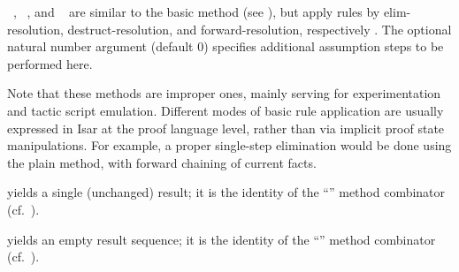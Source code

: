 \begin{isabellebody}
\begin{isamarkuptext}
\begin{description}
  \item \hyperlink{method.erule}{\mbox{}}~, \hyperlink{method.drule}{\mbox{}}~, and \hyperlink{method.frule}{\mbox{}}~ are similar to the basic \hyperlink{method.rule}{\mbox{}}
  method (see ), but apply rules by
  elim-resolution, destruct-resolution, and forward-resolution,
  respectively \cite{isabelle-implementation}.  The optional natural
  number argument (default 0) specifies additional assumption steps to
  be performed here.

  Note that these methods are improper ones, mainly serving for
  experimentation and tactic script emulation.  Different modes of
  basic rule application are usually expressed in Isar at the proof
  language level, rather than via implicit proof state manipulations.
  For example, a proper single-step elimination would be done using
  the plain \hyperlink{method.rule}{\mbox{}} method, with forward chaining of current
  facts.

  \item \hyperlink{method.succeed}{\mbox{}} yields a single (unchanged) result; it is
  the identity of the ``'' method combinator (cf.\
  ).

  \item \hyperlink{method.fail}{\mbox{}} yields an empty result sequence; it is the
  identity of the ``'' method combinator (cf.\
  ).

  \end{description}


\end{isamarkuptext}
\end{isabellebody}

